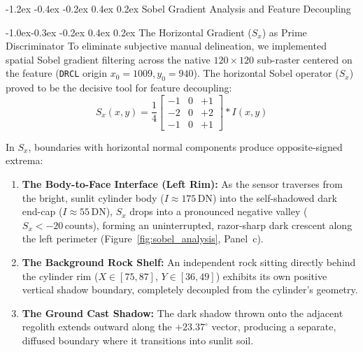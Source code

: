 \documentclass[11pt,a4paper]{article}
\makeatletter
\renewcommand\section{\@startsection {section}{1}{\z@}%
                                   {-1.2ex \@plus -0.4ex \@minus -0.2ex}%
                                   {0.4ex \@plus 0.2ex}%
                                   {\normalfont\large\bfseries}}
\renewcommand\subsection{\@startsection{subsection}{2}{\z@}%
                                     {-1.0ex\@plus -0.3ex \@minus -0.2ex}%
                                     {0.4ex \@plus 0.2ex}%
                                     {\normalfont\normalsize\bfseries}}
\makeatother
\begin{document}
\section{Sobel Gradient Analysis and Feature Decoupling}

\subsection{The Horizontal Gradient \texorpdfstring{($S_x$)}{(Sx)} as Prime Discriminator}
To eliminate subjective manual delineation, we implemented spatial Sobel gradient filtering across the native $120 \times 120$ sub-raster centered on the feature (\texttt{DRCL} origin $x_0 = 1009, y_0 = 940$). The horizontal Sobel operator ($S_x$) proved to be the decisive tool for feature decoupling:
\begin{equation}
	S_x(x, y) = \frac{1}{4} \begin{bmatrix} -1 & 0 & +1 \\ -2 & 0 & +2 \\ -1 & 0 & +1 \end{bmatrix} * I(x, y)
\end{equation}

In $S_x$, boundaries with horizontal normal components produce opposite-signed extrema:
\begin{enumerate}
	\item \textbf{The Body-to-Face Interface (Left Rim):} As the sensor traverses from the bright, sunlit cylinder body ($I \approx 175\,\text{DN}$) into the self-shadowed dark end-cap ($I \approx 55\,\text{DN}$), $S_x$ drops into a pronounced negative valley ($S_x < -20\,\text{counts}$), forming an uninterrupted, razor-sharp dark crescent along the left perimeter (Figure~\ref{fig:sobel_analysis}, Panel~c).
	\item \textbf{The Background Rock Shelf:} An independent rock sitting directly behind the cylinder rim ($X \in [75, 87]$, $Y \in [36, 49]$) exhibits its own positive vertical shadow boundary, completely decoupled from the cylinder's geometry.
	\item \textbf{The Ground Cast Shadow:} The dark shadow thrown onto the adjacent regolith extends outward along the $+23.37^\circ$ vector, producing a separate, diffused boundary where it transitions into sunlit soil.
\end{enumerate}
\end{document}

